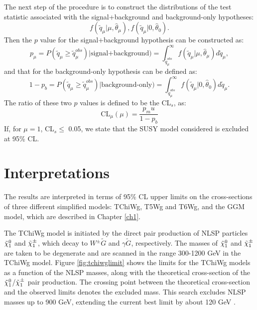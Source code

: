 \documentclass[thesis.tex]{subfiles}
\renewcommand\_{\textunderscore\allowbreak}
\begin{document}
The next step of the procedure is to construct the distributions of the test statistic associated with the signal+background and background-only hypotheses: 
\begin{equation}
	f( \tilde{q}_\mu | \mu, \hat{\theta}_\mu), f( \tilde{q}_\mu | 0, \hat{\theta}_0).
\end{equation}
Then the $p$ value for the signal+background hypothesis can be constructed as:
\begin{equation}
	p_\mu = P( \tilde{q}_\mu \ge \tilde{q}_\mu^{obs}) | \text{signal+background}) = \int_{ \tilde{q}_\mu^{obs}}^\infty f( \tilde{q}_\mu | \mu, \hat{\theta}_\mu) d \tilde{q}_\mu,
\end{equation}
and that for the background-only hypothesis can be defined as:
\begin{equation}
	1- p_b = P( \tilde{q}_\mu \ge \tilde{q}_\mu^{obs}) | \text{background-only}) = \int_{ \tilde{q}_\mu^{obs}}^\infty f( \tilde{q}_\mu | 0, \hat{\theta}_0) d \tilde{q}_\mu. 
\end{equation}
The ratio of these two $p$ values is defined to be the CL$_s$, as:
\begin{equation}
	\text{CL}_\mu(\mu) = \frac{p_mu}{1-p_b}
\end{equation}
If, for $\mu = 1$, CL$_s \le $ 0.05, we state that the SUSY model considered is excluded at 95\% CL. 


\section{Interpretations}

The results are interpreted in terms of 95\% CL upper limits on the cross-sections of three different simplified models: TChiWg, T5Wg and T6Wg, and the GGM model, which are described in Chapter \ref{ch1}. 

The TChiWg model is initiated by the direct pair production of NLSP particles $\tilde{\chi}_1^0$ and $\tilde{\chi}_1^\pm$, which decay to $W^\pm\tilde{G}$ and $\gamma\tilde{G}$, respectively.
The masses of $\tilde{\chi}_1^0$ and $\tilde{\chi}_1^\pm$ are taken to be degenerate and are scanned in the range 300-1200 GeV in the TChiWg model.  
Figure \ref{fig:tchiwglimit} shows the limits for the TChiWg models as a function of the NLSP masses, along with the theoretical cross-section of the $\tilde{\chi}_1^0$/$\tilde{\chi}_1^\pm$ pair production.
The crossing point between the theoretical cross-section and the observed limits denotes the excluded mass. 
This search excludes NLSP masses up to 900 GeV, extending the current best limit by about 120 GeV \cite{}.
\end{document}
